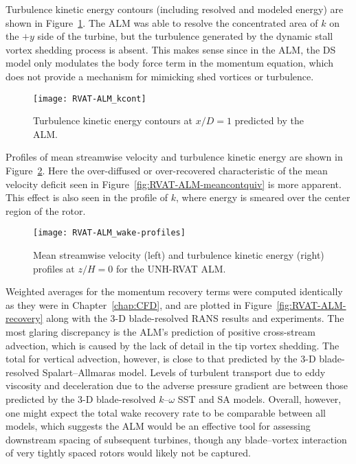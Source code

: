 Turbulence kinetic energy contours (including resolved and modeled energy) are
shown in Figure~\ref{fig:RVAT-ALM-kcont}. The ALM was able to resolve the
concentrated area of $k$ on the $+y$ side of the turbine, but the turbulence
generated by the dynamic stall vortex shedding process is absent. This makes
sense since in the ALM, the DS model only modulates the body force term in the
momentum equation, which does not provide a mechanism for mimicking shed
vortices or turbulence.

\begin{figure}
    \centering

    \texttt{[image: RVAT-ALM\_kcont]}

    \caption{Turbulence kinetic energy contours at $x/D=1$ predicted by the
        ALM.}

    \label{fig:RVAT-ALM-kcont}
\end{figure}

Profiles of mean streamwise velocity and turbulence kinetic energy are shown in
Figure~\ref{fig:RVAT-ALM-profiles}. Here the over-diffused or over-recovered
characteristic of the mean velocity deficit seen in
Figure~\ref{fig:RVAT-ALM-meancontquiv} is more apparent. This effect is also
seen in the profile of $k$, where energy is smeared over the center region of
the rotor.

\begin{figure}
    \centering

    \texttt{[image: RVAT-ALM\_wake-profiles]}

    \caption{Mean streamwise velocity (left) and turbulence kinetic energy
        (right) profiles at $z/H=0$ for the UNH-RVAT ALM.}

    \label{fig:RVAT-ALM-profiles}
\end{figure}

Weighted averages for the momentum recovery terms were computed identically as
they were in Chapter~\ref{chap:CFD}, and are plotted in
Figure~\ref{fig:RVAT-ALM-recovery} along with the 3-D blade-resolved RANS
results and experiments. The most glaring discrepancy is the ALM's prediction of
positive cross-stream advection, which is caused by the lack of detail in the
tip vortex shedding. The total for vertical advection, however, is close to that
predicted by the 3-D blade-resolved Spalart--Allmaras model. Levels of turbulent
transport due to eddy viscosity and deceleration due to the adverse pressure
gradient are between those predicted by the 3-D blade-resolved $k$--$\omega$ SST
and SA models. Overall, however, one might expect the total wake recovery rate
to be comparable between all models, which suggests the ALM would be an
effective tool for assessing downstream spacing of subsequent turbines, though
any blade--vortex interaction of very tightly spaced rotors would likely not be
captured.

